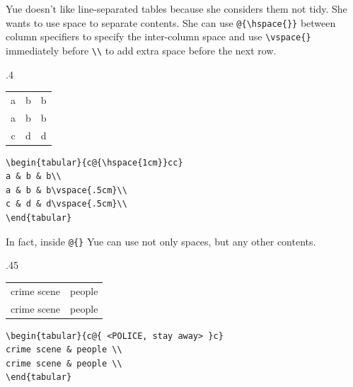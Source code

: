 Yue doesn't like line-separated tables because she considers them not tidy. She wants to use space to separate contents. She can use \verb=@{\hspace{}}= between column specifiers to specify the inter-column space and use \verb=\vspace{}= immediately before \verb=\\= to add extra space before the next row.
\begin{miniexammar}{.4\textandmarginlen}{
\begin{tabular}{c@{\hspace{1cm}}cc}
a & b & b\\
a & b & b\vspace{.5cm}\\
c & d & d\vspace{.5cm}\\
\end{tabular}
}
\begin{lstlisting}
\begin{tabular}{c@{\hspace{1cm}}cc}
a & b & b\\
a & b & b\vspace{.5cm}\\
c & d & d\vspace{.5cm}\\
\end{tabular} 
\end{lstlisting}
\end{miniexammar}
In fact, inside \verb=@{}= Yue can use not only spaces, but any other contents.
\begin{miniexammar}{.45\textandmarginlen}{
\begin{tabular}{c@{ <POLICE, stay away> }c}
crime scene & people \\
crime scene & people \\
\end{tabular}
}
\begin{lstlisting}
\begin{tabular}{c@{ <POLICE, stay away> }c}
crime scene & people \\
crime scene & people \\
\end{tabular}
\end{lstlisting}
\end{miniexammar}

